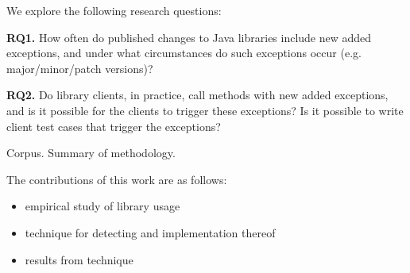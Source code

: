 We explore the following research questions:

\noindent
{\bf RQ1.} How often do published changes to Java libraries include new added exceptions,
and under what circumstances do such exceptions occur (e.g. major/minor/patch versions)?

\noindent
{\bf RQ2.} Do library clients, in practice, call methods with new added exceptions, and is it possible for the clients to trigger these exceptions? Is it possible to write client test cases that trigger the exceptions?

\vspace*{1em}

Corpus. Summary of methodology.

The contributions of this work are as follows: 

\begin{itemize}[noitemsep]
\item empirical study of library usage
\item technique for detecting and implementation thereof
  \item results from technique
\end{itemize}




